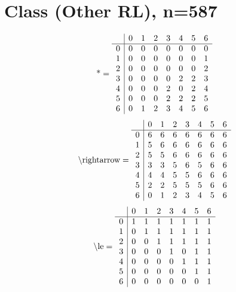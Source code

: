 \documentclass[11pt]{article}
\begin{document}
\section{Class (Other RL), n=587}
\[\text{*} = 
\begin{array}{r | r r r r r r r}
 & 0 & 1 & 2 & 3 & 4 & 5 & 6 \\ \hline
0 & 0 & 0 & 0 & 0 & 0 & 0 & 0 \\
1 & 0 & 0 & 0 & 0 & 0 & 0 & 1 \\
2 & 0 & 0 & 0 & 0 & 0 & 0 & 2 \\
3 & 0 & 0 & 0 & 0 & 2 & 2 & 3 \\
4 & 0 & 0 & 0 & 2 & 0 & 2 & 4 \\
5 & 0 & 0 & 0 & 2 & 2 & 2 & 5 \\
6 & 0 & 1 & 2 & 3 & 4 & 5 & 6 \\
\end{array}
\]
\[\text{\textbackslash rightarrow} = 
\begin{array}{r | r r r r r r r}
 & 0 & 1 & 2 & 3 & 4 & 5 & 6 \\ \hline
0 & 6 & 6 & 6 & 6 & 6 & 6 & 6 \\
1 & 5 & 6 & 6 & 6 & 6 & 6 & 6 \\
2 & 5 & 5 & 6 & 6 & 6 & 6 & 6 \\
3 & 3 & 3 & 5 & 6 & 5 & 6 & 6 \\
4 & 4 & 4 & 5 & 5 & 6 & 6 & 6 \\
5 & 2 & 2 & 5 & 5 & 5 & 6 & 6 \\
6 & 0 & 1 & 2 & 3 & 4 & 5 & 6 \\
\end{array}
\]
\[\text{\textbackslash le} = 
\begin{array}{r | r r r r r r r}
 & 0 & 1 & 2 & 3 & 4 & 5 & 6 \\ \hline
0 & 1 & 1 & 1 & 1 & 1 & 1 & 1 \\
1 & 0 & 1 & 1 & 1 & 1 & 1 & 1 \\
2 & 0 & 0 & 1 & 1 & 1 & 1 & 1 \\
3 & 0 & 0 & 0 & 1 & 0 & 1 & 1 \\
4 & 0 & 0 & 0 & 0 & 1 & 1 & 1 \\
5 & 0 & 0 & 0 & 0 & 0 & 1 & 1 \\
6 & 0 & 0 & 0 & 0 & 0 & 0 & 1 \\
\end{array}
\]
\end{document}
